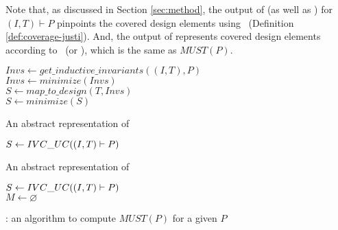 Note that, as discussed in Section \ref{sec:method}, the
output of \ucalg (as well as \ucbfalg) for $(I, T) \vdash P$ pinpoints the covered design elements
using \ivccov\ (Definition \ref{def:coverage-justi}). 
And, the output of \mustalg represents covered design elements according to \nondetcovalt\ (or \nondetcov ), which is the same as $MUST(P)$.

\begin{algorithm}
  \BlankLine
  $Invs \leftarrow get\_inductive\_invariants((I, T), P)$ \\
  $Invs \leftarrow minimize(Invs)$ \\
  $S \leftarrow map\_to\_design (T, Invs)$ \\
  $S \leftarrow minimize(S)$ \\
\caption{An abstract representation of \ucalg \cite{Ghass16}}
\label{alg:uc}
\end{algorithm}

\begin{algorithm}
  \BlankLine
  $S \leftarrow {IVC\_UC}((I, T) \vdash P)$ \\
   {
  }
\caption{An abstract representation of \ucbfalg \cite{Ghass16}}
\label{alg:ucbf}
\end{algorithm}


\begin{algorithm}
  \BlankLine
  $S \leftarrow {IVC\_UC}((I, T) \vdash P)$ \\
  $M \leftarrow \varnothing$ \\
   {
  }
\caption{\mustalg: an algorithm to compute $MUST(P)$ for a given $P$}
\label{alg:must}
\end{algorithm}

